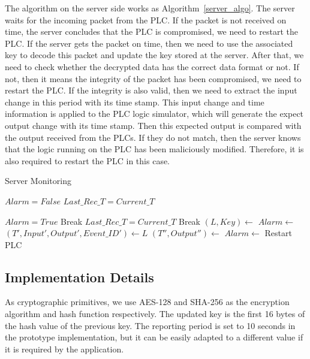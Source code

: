 The algorithm on the server side works as Algorithm~\ref{server_algo}. The server waits for the incoming packet from the PLC. If the packet is not received on time, the server concludes that the PLC is compromised, we need to restart the PLC. If the server gets the packet on time, then we need to use the associated key to decode this packet and update the key stored at the server. After that, we need to check whether the decrypted data has the correct data format or not. If not, then it means the integrity of the packet has been compromised, we need to restart the PLC. If the integrity is also valid, then we need to extract the input change in this period with its time stamp. This input change and time information is applied to the PLC logic simulator, which will generate the expect output change with its time stamp. Then this expected output is compared with the output received from the PLCs. If they do not match, then the server knows that the logic running on the PLC has been maliciously modified. Therefore, it is also required to restart the PLC in this case.   

\begin{algorithm}[!t]
\caption{Server Monitoring}\label{server_algo}
\begin{algorithmic}[1]
	
	\State $Alarm = False$
	\State $Last\_Rec\_T = Current\_T$
	
				\State $Alarm = True$
				\State Break 
			\EndIf
				\State $Last\_Rec\_T = Current\_T$ 
				\State Break 
			\EndIf
		\EndWhile
		\State $(L, Key) \gets $ 
		\State $Alarm \gets $ 
		\State $(T', Input', Output', Event\_ID') \gets L$
		\State $(T'', Output'') \gets $ 
		\State $Alarm \gets $ 
			\State Restart PLC
		\EndIf
	\EndWhile
\EndProcedure
\end{algorithmic}
\end{algorithm}

\subsection{Implementation Details}

As cryptographic primitives, we use AES-128 and SHA-256 as the encryption algorithm and hash function respectively. The updated key is the first 16 bytes of the hash value of the previous key. The reporting period is set to 10 seconds in the prototype implementation, but it can be easily adapted to a different value if it is required by the application. 


